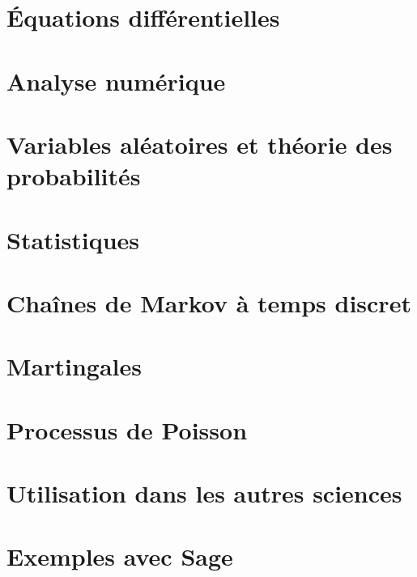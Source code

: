 \chapter{Équations différentielles}



\chapter{Analyse numérique}


\chapter{Variables aléatoires et théorie des probabilités}




\chapter{Statistiques}


\chapter{Chaînes de Markov à temps discret}


\chapter{Martingales}


\chapter{Processus de Poisson}


\chapter{Utilisation dans les autres sciences}


\chapter{Exemples avec Sage}


%

 
